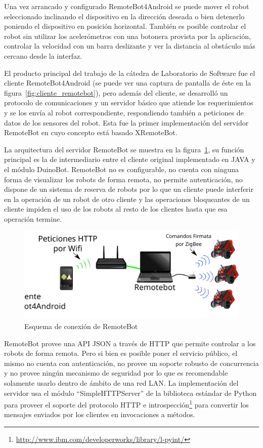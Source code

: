 Una vez arrancado y configurado RemoteBot4Android se puede mover el robot
seleccionado inclinando el dispositivo en la dirección deseada o bien
detenerlo poniendo el dispositivo en posición horizontal. También es
posible controlar el robot sin utilizar los acelerómetros
con una botonera provista por la aplicación,
controlar la velocidad con un barra deslizante y ver la distancia al obstáculo
más cercano desde la interfaz.

El producto principal del trabajo de la cátedra de Laboratorio de
Software fue el cliente
RemoteBot4Android (se puede ver una captura de pantalla de éste
en la figura~\ref{fig:cliente_remotebot}),
pero además del cliente, se desarrolló un
protocolo de comunicaciones
y un servidor básico que atiende los requerimientos y se los envía al
robot correspondiente, respondiendo también a peticiones de datos de
los sensores del
robot. Esta fue la primer implementación del servidor
RemoteBot
en cuyo concepto está basado XRemoteBot.

La arquitectura del servidor RemoteBot se muestra en la
figura~\ref{fig:arquitectura_remotebot}, su función principal es la
de intermediario entre el cliente original implementado en JAVA
 y el módulo DuinoBot.
RemoteBot no es configurable, no cuenta con ninguna forma de visualizar
los robots de forma remota, no permite autenticación, no dispone de un
sistema de reserva de robots por lo que un cliente puede interferir en la
operación de un robot de otro cliente y las operaciones bloqueantes de un
cliente impiden el uso de los robots al resto de los clientes hasta que esa
operación termine.

\begin{figure}
    \centering
    \includegraphics[width=\textwidth]{figures/arquitectura_remotebot}
    \caption{Esquema de conexión de RemoteBot}\label{fig:arquitectura_remotebot}
\end{figure}

RemoteBot provee una API JSON a través de HTTP que permite controlar a los
robots de forma remota. Pero si bien es posible poner el servicio público,
el mismo no cuenta con autenticación, no provee un soporte robusto de
concurrencia y no provee ningún mecanismo de seguridad por lo que es
recomendable solamente usarlo dentro de ámbito de una red LAN.
La implementación del servidor
usa el módulo ``SimpleHTTPServer'' de la biblioteca estándar de Python para
proveer el soporte del protocolo HTTP e
introspección\footnote{\url{http://www.ibm.com/developerworks/library/l-pyint/}}
para convertir los
mensajes enviados por los clientes en invocaciones a métodos.


